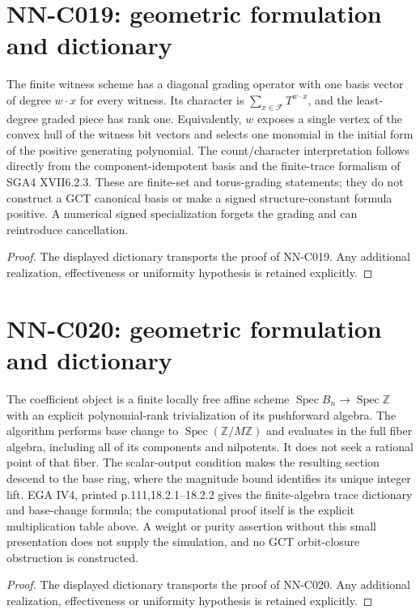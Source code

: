 \section{NN-C019: geometric formulation and dictionary}
\begin{geometricstatement}[NN-C019]
The finite witness scheme has a diagonal grading operator with one basis vector of degree $w\cdot x$ for every witness. Its character is $\sum_{x\in\mathcal F}T^{w\cdot x}$, and the least-degree graded piece has rank one. Equivalently, $w$ exposes a single vertex of the convex hull of the witness bit vectors and selects one monomial in the initial form of the positive generating polynomial. The count/character interpretation follows directly from the component-idempotent basis and the finite-trace formalism of SGA4 XVII6.2.3. These are finite-set and torus-grading statements; they do not construct a GCT canonical basis or make a signed structure-constant formula positive. A numerical signed specialization forgets the grading and can reintroduce cancellation.
\end{geometricstatement}
\begin{proof} The displayed dictionary transports the proof of NN-C019. Any additional realization, effectiveness or uniformity hypothesis is retained explicitly.\end{proof}


\section{NN-C020: geometric formulation and dictionary}
\begin{geometricstatement}[NN-C020]
The coefficient object is a finite locally free affine scheme $\operatorname{Spec}B_n\to\operatorname{Spec}\mathbb Z$ with an explicit polynomial-rank trivialization of its pushforward algebra. The algorithm performs base change to $\operatorname{Spec}(\mathbb Z/M\mathbb Z)$ and evaluates in the full fiber algebra, including all of its components and nilpotents. It does not seek a rational point of that fiber. The scalar-output condition makes the resulting section descend to the base ring, where the magnitude bound identifies its unique integer lift. EGA IV4, printed p.111,18.2.1--18.2.2 gives the finite-algebra trace dictionary and base-change formula; the computational proof itself is the explicit multiplication table above. A weight or purity assertion without this small presentation does not supply the simulation, and no GCT orbit-closure obstruction is constructed.
\end{geometricstatement}
\begin{proof} The displayed dictionary transports the proof of NN-C020. Any additional realization, effectiveness or uniformity hypothesis is retained explicitly.\end{proof}


